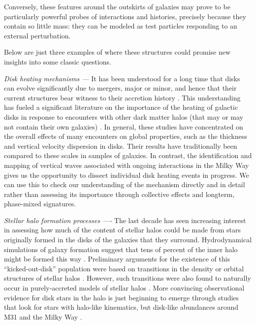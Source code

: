 \documentclass[galaxies,article,submit,moreauthors,pdftex,10pt,a4paper]{mdpi}
\begin{document}
Conversely, these features around the outskirts of galaxies may prove to be particularly powerful probes of interactions and histories, precisely because they contain so little mass: they can be modeled as test particles responding to an external perturbation.

Below are just three examples of where these structures could promise new insights into some classic questions.
\begin{description}
\item{\it Disk heating mechanisms ---}
It has been understood for a long time that disks can evolve significantly due to mergers, major or minor, and hence that their current structures bear witness to their accretion history \cite{toth92,quinn93,walker96,velazquez99}.
This understanding has fueled a significant literature on the importance of the heating of galactic disks in response to encounters with other dark matter halos (that may or may not contain their own galaxies) \cite{font01,ardi03,benson04,stewart08,hopkins08,villalobos08,purcell09,kazantzidis09,sachdeva16,moetazedian16}.
In general, these studies have concentrated on the overall effects of many encounters on global properties, such as the thickness and vertical velocity dispersion in disks.
Their results have traditionally been compared to these scales in samples of galaxies.
In contrast, the identification and mapping of vertical waves associated with ongoing interactions in the Milky Way gives us the opportunity to dissect individual disk heating events in progress.
We can use this to check our understanding of the mechanism directly and in detail rather than assessing its importance through collective effects and longterm, phase-mixed signatures.
\item{\it Stellar halo formation processes ----}
The last decade has seen increasing interest in assessing how much of the content of stellar halos could be made from stars originally formed in the disks of the galaxies that they surround. Hydrodynamical simulations of galaxy formation suggest that tens of percent of the inner halo might be formed this way
\cite{abadi06,zolotov09,zolotov10,font11,mccarthy12,tissera13,tissera14,pillepich15,cooper15}.
Preliminary arguments for the existence of this ``kicked-out-disk'' population were based on transitions in the density or orbital structures of stellar halos \cite[e.g.,][]{carollo07}.
However, such transitions were also found to naturally occur in purely-accreted models of stellar halos \cite{deason13}.
More convincing observational evidence for disk stars in the halo is just beginning to emerge through studies that look for stars with halo-like kinematics, but disk-like abundances around M31 \cite{dorman13} and the Milky Way \cite{sheffield12,hawkins15,bonaca17}.

\end{description}
\end{document}
